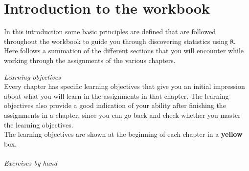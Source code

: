 \section{Introduction to the workbook}

In this introduction some basic principles are defined that are followed throughout the workbook to guide you through discovering statistics using \texttt{R}. Here follows a summation of the different sections that you will encounter while working through the assignments of the various chapters. \\

\bigskip

\textit{Learning objectives} \\

Every chapter has specific learning objectives that give you an initial impression about what you will learn in the assignments in that chapter. The learning objectives also provide a good indication of your ability after finishing the assignments in a chapter, since you can go back and check whether you master the learning objectives. \\

The learning objectives are shown at the beginning of each chapter in a {\color{learningobjectives} \selectfont \textbf{yellow}} box. \\

\emptylearningobjectives \\

\textit{Exercises by hand} \\

